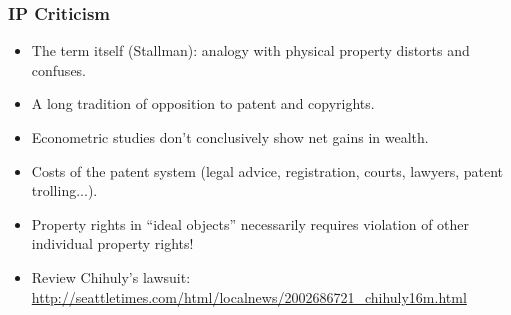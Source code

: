 \documentclass{beamer}
\begin{document}
\begin{frame}
\frametitle{IP Criticism}

\begin{itemize}
\item The term itself (Stallman): analogy with physical property distorts and confuses.
\item A long tradition of opposition to patent and copyrights.
\item Econometric studies don't conclusively show net gains in wealth.
\item Costs of the patent system (legal advice, registration, courts, lawyers, \alert{patent trolling}...).
\item Property rights in ``ideal objects'' necessarily \alert{requires violation of other individual property rights}!
\item Review Chihuly's lawsuit: \\ \tiny{\url{http://seattletimes.com/html/localnews/2002686721_chihuly16m.html}}
\end{itemize}

\end{frame}

\end{document}
